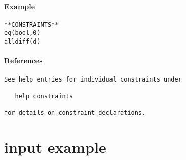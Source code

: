 \paragraph{Example}
{\footnotesize
\begin{verbatim}
**CONSTRAINTS**
eq(bool,0)
alldiff(d)
\end{verbatim}
}
\paragraph{References}
{\footnotesize
\begin{verbatim}
See help entries for individual constraints under

   help constraints

for details on constraint declarations.
\end{verbatim}
}
\section{input example}
